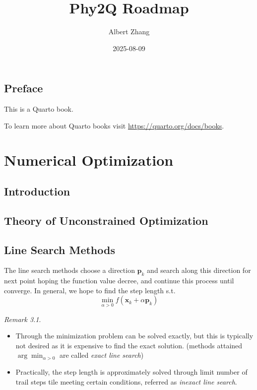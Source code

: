 \documentclass[
  letterpaper,
  DIV=11,
  numbers=noendperiod]{scrreprt}
\title{Phy2Q Roadmap}
\author{Albert Zhang}
\date{2025-08-09}
\providecommand{\tightlist}{%
  \setlength{\itemsep}{0pt}\setlength{\parskip}{0pt}}
\renewcommand*\contentsname{Table of contents}
\newcommand\contentsname{Table of contents}
\theoremstyle{definition}
\theoremstyle{plain}
\theoremstyle{plain}
\theoremstyle{definition}
\theoremstyle{plain}
\theoremstyle{plain}
\theoremstyle{remark}
\newtheorem{refremark}{Remark}[chapter]
\begin{document}
\maketitle



\renewcommand*\contentsname{Table of contents}
{
\hypersetup{linkcolor=}
\setcounter{tocdepth}{2}
\tableofcontents
}


\chapter*{Preface}\label{preface}


This is a Quarto book.

To learn more about Quarto books visit
\url{https://quarto.org/docs/books}.

\part{Numerical Optimization}

\chapter{Introduction}\label{introduction}

\chapter{Theory of Unconstrained
Optimization}\label{theory-of-unconstrained-optimization}

\chapter{Line Search Methods}\label{line-search-methods}

The line search methods choose a direction \(\mathbf{p}_k\) and search
along this direction for next point hoping the function value decree,
and continue this process until converge. In general, we hope to find
the step length s.t. \[
\min_{\alpha>0}f(\mathbf{x}_k+\alpha\mathbf{p}_k)
\]

\begin{refremark}
\leavevmode

\begin{itemize}
\tightlist
\item
  Through the minimization problem can be solved exactly, but this is
  typically not desired as it is expensive to find the exact solution.
  (methods attained \(\arg\min_{\alpha>0}\) are called \emph{exact line
  search})
\item
  Practically, the step length is approximately solved through limit
  number of trail steps tile meeting certain conditions, referred as
  \emph{inexact line search}.
\end{itemize}

\label{rem-lineSearch1}

\end{refremark}
\end{document}
